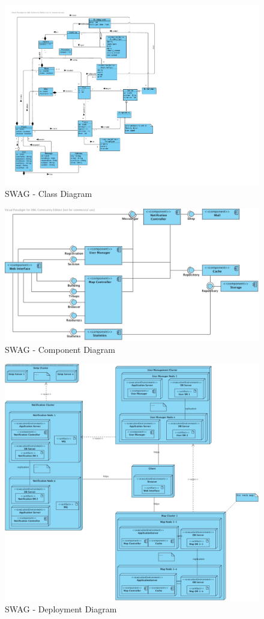 \documentclass[11pt]{article}
\begin{document}
\begin{figure}[h]
\center
\includegraphics[scale=0.9]{diagrams/SWAG_Class_Diagram.pdf}
\caption{SWAG - Class Diagram}
\label{fig:class}
\end{figure}

\begin{figure}[h]
\center
\includegraphics[scale=0.5]{diagrams/SWAG_Component_Diagram.pdf}
\caption{SWAG - Component Diagram}
\label{fig:component}
\end{figure}

\begin{figure}[h]
\hspace{-2.3cm}
\includegraphics[scale=0.45]{diagrams/SWAG_Deployment_Diagram.pdf}
\caption{SWAG - Deployment Diagram}
\label{fig:deployment}
\end{figure}

 
\end{document}
